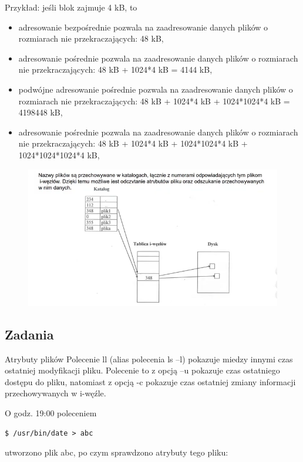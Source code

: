 \documentclass[11pt]{article}
\begin{document}
Przykład: jeśli blok zajmuje 4 kB, to
\begin{itemize}
    \item adresowanie bezpośrednie pozwala na zaadresowanie danych plików o rozmiarach
          nie przekraczających: 48 kB,
    \item adresowanie pośrednie pozwala na zaadresowanie danych plików o rozmiarach
          nie przekraczających: 48 kB + 1024*4 kB = 4144 kB,
    \item podwójne adresowanie pośrednie pozwala na zaadresowanie danych plików
          o rozmiarach nie przekraczających: 48 kB + 1024*4 kB + 1024*1024*4 kB = 4198448 kB,
    \item adresowanie pośrednie pozwala na zaadresowanie danych plików o rozmiarach
          nie przekraczających: 48 kB + 1024*4 kB + 1024*1024*4 kB + 1024*1024*1024*4 kB,
\end{itemize}

\begin{figure}[H]
    \centering
    \includegraphics[width=1\linewidth]{./img/so1-05.png}
\end{figure}

\subsection{Zadania}

Atrybuty plików
Polecenie ll (alias polecenia ls –l) pokazuje miedzy innymi czas
ostatniej modyfikacji pliku. Polecenie to z opcją –u pokazuje czas
ostatniego dostępu do pliku, natomiast z opcją -c pokazuje czas
ostatniej zmiany informacji przechowywanych w i-węźle.

O godz. 19:00 poleceniem

\begin{verbatim}
$ /usr/bin/date > abc
\end{verbatim}
utworzono plik abc, po czym sprawdzono atrybuty tego pliku:
\end{document}
